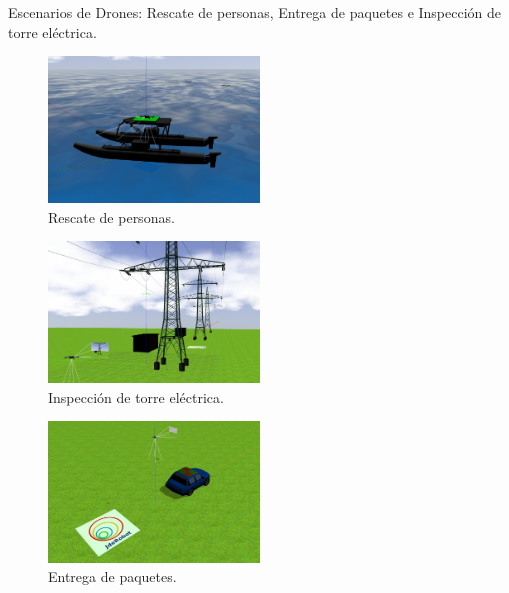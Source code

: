 \documentclass[a4paper, 12pt]{book}
\begin{document}
Escenarios de Drones: Rescate de personas, Entrega de paquetes e Inspección de torre eléctrica.
\begin{figure}[H]
	\centering
	\includegraphics[width=0.5\textwidth]{img/drones_rescate}
	\caption{Rescate de personas.}
\end{figure}
\begin{figure}[H]
	\centering
	\includegraphics[width=0.5\textwidth]{img/torre1}
	\caption{Inspección de torre eléctrica.}
\end{figure}
\begin{figure}[H]
	\centering
	\includegraphics[width=0.5\textwidth]{img/torre2}
	\caption{Entrega de paquetes.}
\end{figure}
\end{document}
